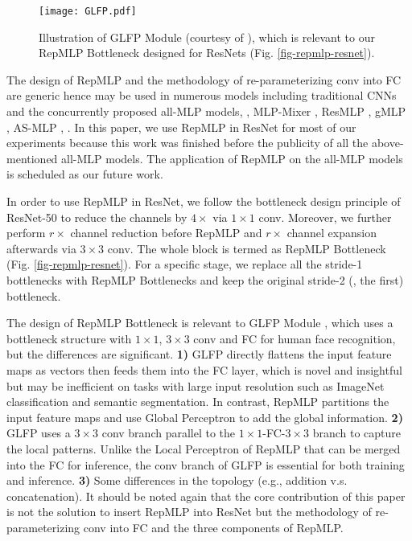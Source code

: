 \documentclass[10pt,twocolumn,letterpaper]{article}
\begin{document}
\begin{figure}
	\begin{center}
		\texttt{[image: GLFP.pdf]}
		\vspace{-0.20in}
		\caption{Illustration of GLFP Module (courtesy of \cite{xiapatent}), which is relevant to our RepMLP Bottleneck designed for ResNets (Fig. \ref{fig-repmlp-resnet}).}
		\label{fig-GLFP}
		\vspace{-0.3in}
	\end{center}
\end{figure}

The design of RepMLP and the methodology of re-parameterizing conv into FC are generic hence may be used in numerous models including traditional CNNs and the concurrently proposed all-MLP models, \eg, MLP-Mixer \cite{tolstikhin2021mlp}, ResMLP \cite{touvron2021resmlp}, gMLP \cite{liu2021pay}, AS-MLP \cite{lian2021mlp}, \etc. In this paper, we use RepMLP in ResNet for most of our experiments because this work was finished before the publicity of all the above-mentioned all-MLP models. The application of RepMLP on the all-MLP models is scheduled as our future work.

In order to use RepMLP in ResNet, we follow the bottleneck \cite{he2016deep} design principle of ResNet-50 to reduce the channels by $4\times$ via $1\times1$ conv. Moreover, we further perform $r\times$ channel reduction before RepMLP and $r\times$ channel expansion afterwards via $3\times3$ conv. The whole block is termed as RepMLP Bottleneck (Fig. \ref{fig-repmlp-resnet}). For a specific stage, we replace all the stride-1 bottlenecks with RepMLP Bottlenecks and keep the original stride-2 (\ie, the first) bottleneck.

The design of RepMLP Bottleneck is relevant to GLFP Module \cite{xiapatent}, which uses a bottleneck structure with $1\times1$, $3\times3$ conv and FC for human face recognition, but the differences are significant. \textbf{1)} GLFP directly flattens the input feature maps as vectors then feeds them into the FC layer, which is novel and insightful but may be inefficient on tasks with large input resolution such as ImageNet classification and semantic segmentation. In contrast, RepMLP partitions the input feature maps and use Global Perceptron to add the global information. \textbf{2)} GLFP uses a $3\times3$ conv branch parallel to the $1\times1$-FC-$3\times3$ branch to capture the local patterns. Unlike the Local Perceptron of RepMLP that can be merged into the FC for inference, the conv branch of GLFP is essential for both training and inference. \textbf{3)} Some differences in the topology (e.g., addition v.s. concatenation). It should be noted again that the core contribution of this paper is not the solution to insert RepMLP into ResNet but the methodology of re-parameterizing conv into FC and the three components of RepMLP.
\end{document}
